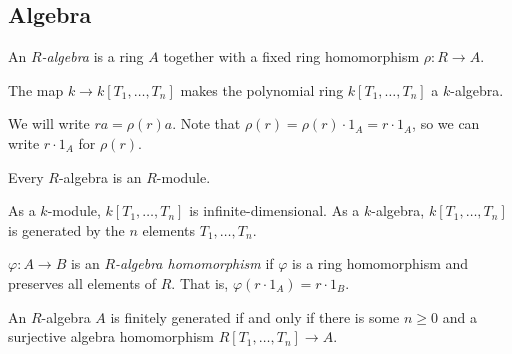 \subsection{Algebra}
\begin{definition}
    An \emph{\( R \)-algebra} is a ring \( A \) together with a fixed ring homomorphism \( \rho : R \to A \).
\end{definition}
\begin{example}
    The map \( k \to k[T_1, \dots, T_n] \) makes the polynomial ring \( k[T_1, \dots, T_n] \) a \( k \)-algebra.
\end{example}
We will write \( ra = \rho(r) a \).
Note that \( \rho(r) = \rho(r) \cdot 1_A = r \cdot 1_A \), so we can write \( r \cdot 1_A \) for \( \rho(r) \).
\begin{remark}
    Every \( R \)-algebra is an \( R \)-module.
\end{remark}
\begin{example}
    As a \( k \)-module, \( k[T_1, \dots, T_n] \) is infinite-dimensional.
    As a \( k \)-algebra, \( k[T_1, \dots, T_n] \) is generated by the \( n \) elements \( T_1, \dots, T_n \).
\end{example}
\begin{definition}
    \( \varphi : A \to B \) is an \emph{\( R \)-algebra homomorphism} if \( \varphi \) is a ring homomorphism and preserves all elements of \( R \).
    That is, \( \varphi(r \cdot 1_A) = r \cdot 1_B \).
\end{definition}
An \( R \)-algebra \( A \) is finitely generated if and only if there is some \( n \geq 0 \) and a surjective algebra homomorphism \( R[T_1, \dots, T_n] \to A \).
